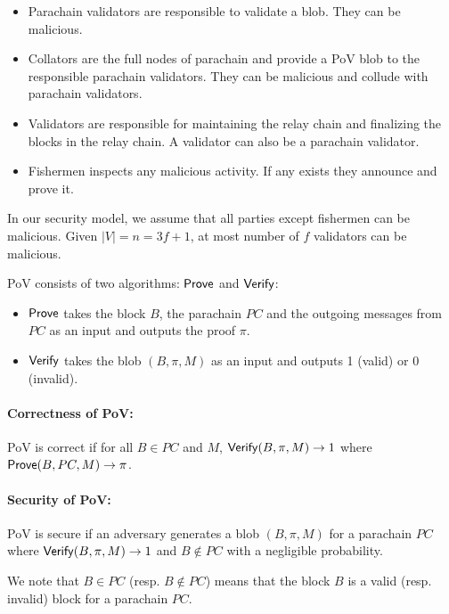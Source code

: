 \begin{itemize}

\item Parachain validators are responsible to validate a blob. They can be malicious.
\item Collators are the full nodes of parachain and provide a PoV blob to the responsible parachain validators. They can be malicious and collude with parachain validators.
\item Validators are responsible for maintaining the relay chain and finalizing the blocks in the relay chain. A validator can also be a parachain validator. 
\item Fishermen inspects any malicious activity. If any exists they announce and prove it.  



\end{itemize}

In our security model, we assume that all parties except fishermen can be malicious. Given $|V| = n = 3f + 1$, at most number of $f$ validators can be malicious.


\begin{definition}\label{def:pob}
PoV consists of two algorithms: $\mathsf{Prove}$ and $\mathsf{Verify}$:
\begin{itemize}
    \item $\mathsf{Prove}$  takes the block $B$, the parachain $PC$ and the outgoing messages from $PC$ as an input and outputs the proof $\pi$.
    \item $\mathsf{Verify}$  takes the blob $(B,\pi,M)$ as an input and outputs 1 (valid) or 0 (invalid).
\end{itemize}
\end{definition}
\paragraph{Correctness of PoV:} PoV is correct if for all $B \in PC$ and $M$, $\mathsf{Verify}(B,\pi,M)\rightarrow 1$ where $\mathsf{Prove}(B, PC,M)\rightarrow \pi$.

\paragraph{Security of PoV:} PoV is secure if an adversary generates a blob $(B,\pi,M)$ for a parachain $PC$ where  $\mathsf{Verify}(B,\pi,M) \rightarrow 1$ and $B \notin PC$ with a negligible probability.


We note that $B\in PC$ (resp. $B \notin PC$) means that the block $B$ is a valid (resp. invalid) block for a parachain $PC$.


